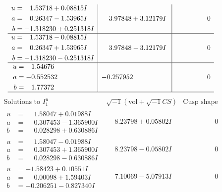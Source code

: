 \documentclass[1p]{elsarticle_modified}
\theoremstyle{definition}
\newcommand{\I}{\sqrt{-1}}
\begin{document}
$$\begin{array}{c|c|c}
\begin{aligned}
u &= \phantom{-}1.53718 + 0.08815 I \\
a &= \phantom{-}0.26347 - 1.53965 I \\
b &= -1.318230 + 0.251318 I\end{aligned}
 & \phantom{-}3.97848 + 3.12179 I & \phantom{-0.000000 } 0 \\ \hline\begin{aligned}
u &= \phantom{-}1.53718 - 0.08815 I \\
a &= \phantom{-}0.26347 + 1.53965 I \\
b &= -1.318230 - 0.251318 I\end{aligned}
 & \phantom{-}3.97848 - 3.12179 I & \phantom{-0.000000 } 0 \\ \hline\begin{aligned}
u &= \phantom{-}1.54676\phantom{ +0.000000I} \\
a &= -0.552532\phantom{ +0.000000I} \\
b &= \phantom{-}1.77372\phantom{ +0.000000I}\end{aligned}
 & -0.257952\phantom{ +0.000000I} & \phantom{-0.000000 } 0\\
 \hline 
 \end{array}$$\newpage$$\begin{array}{c|c|c}  
\text{Solutions to }I^u_{1}& \I (\text{vol} + \sqrt{-1}CS) & \text{Cusp shape}\\
 \hline 
\begin{aligned}
u &= \phantom{-}1.58047 + 0.01988 I \\
a &= \phantom{-}0.307453 - 1.365900 I \\
b &= \phantom{-}0.028298 + 0.630886 I\end{aligned}
 & \phantom{-}8.23798 + 0.05802 I & \phantom{-0.000000 } 0 \\ \hline\begin{aligned}
u &= \phantom{-}1.58047 - 0.01988 I \\
a &= \phantom{-}0.307453 + 1.365900 I \\
b &= \phantom{-}0.028298 - 0.630886 I\end{aligned}
 & \phantom{-}8.23798 - 0.05802 I & \phantom{-0.000000 } 0 \\ \hline\begin{aligned}
u &= -1.58423 + 0.10551 I \\
a &= \phantom{-}0.00098 + 1.59403 I \\
b &= -0.206251 - 0.827340 I\end{aligned}
 & \phantom{-}7.10069 - 5.07913 I & \phantom{-0.000000 } 0 \\ \hline\begin{aligned}

\end{aligned}
\end{array}$$
\end{document}
